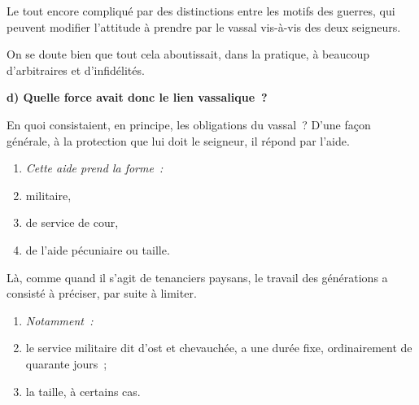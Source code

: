 \documentclass[french,twoside]{book} %
\newlength{\listmod}
\newcommand{\listhead}[1]{\hspace{-1\listmod}\emph{#1}}
\newcommand{\labelchar}[1]{\textbf{\color{rubric} #1}}
\begin{document}
\noindent Le tout encore compliqué par des distinctions entre les motifs des guerres, qui peuvent modifier l’attitude à prendre par le vassal vis-à-vis des deux seigneurs.\par
On se doute bien que tout cela aboutissait, dans la pratique, à beaucoup d’arbitraires et d’infidélités.\par
\bigbreak
\noindent \labelchar{d) Quelle force avait donc le lien vassalique ?}\par
En quoi consistaient, en principe, les obligations du vassal ? D’une façon générale, à la protection que lui doit le seigneur, il répond par l’aide.\par

\begin{enumerate}[itemsep=0pt,]
\item[]\listhead{Cette aide prend la forme :}
\item militaire,
\item de service de cour,
\item de l’aide pécuniaire ou taille.
\end{enumerate}

\noindent Là, comme quand il s’agit de tenanciers paysans, le travail des générations a consisté à préciser, par suite à limiter.\par

\begin{enumerate}[itemsep=0pt,]
\item[]\listhead{Notamment :}
\item le service militaire dit d’ost et chevauchée, a une durée fixe, ordinairement de quarante jours ;
\item la taille, à certains cas.
\end{enumerate}
\end{document}
